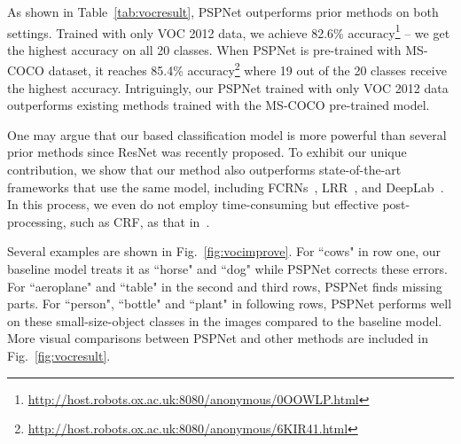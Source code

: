 \documentclass[10pt,twocolumn,letterpaper]{article}
\begin{document}
As shown in Table~\ref{tab:vocresult}, PSPNet outperforms prior methods on both settings.
Trained with only VOC 2012 data, we achieve 82.6\%
accuracy\footnote{\href{http://host.robots.ox.ac.uk:8080/anonymous/0OOWLP.html}{http://host.robots.ox.ac.uk:8080/anonymous/0OOWLP.html}}
-- we get the highest accuracy on all 20 classes. When PSPNet is pre-trained with MS-COCO
dataset, it reaches 85.4\%
accuracy\footnote{\href{http://host.robots.ox.ac.uk:8080/anonymous/6KIR41.html}{http://host.robots.ox.ac.uk:8080/anonymous/6KIR41.html}}
where 19 out of the 20 classes receive the highest accuracy. Intriguingly, our PSPNet
trained with only VOC 2012 data outperforms existing methods trained with the MS-COCO
pre-trained model.

One may argue that our based classification model is more powerful than several prior methods
since ResNet was recently proposed. To exhibit our unique contribution, we show that our
method also outperforms state-of-the-art frameworks that use the same model, including
FCRNs~\cite{wu2016bridging}, LRR~\cite{ghiasi2016laplacian}, and
DeepLab~\cite{chen2016deeplab}. In this process, we even do not employ time-consuming but
effective post-processing, such as CRF, as that in~\cite{chen2016deeplab,ghiasi2016laplacian}.

Several examples are shown in Fig.~\ref{fig:vocimprove}. For ``cows" in row one, our
baseline model treats it as ``horse" and ``dog" while PSPNet corrects these errors. For
``aeroplane" and ``table" in the second and third rows, PSPNet finds missing parts. For
``person", ``bottle" and ``plant" in following rows, PSPNet performs well on these
small-size-object classes in the images compared to the baseline model. More visual
comparisons between PSPNet and other methods are included in Fig.~\ref{fig:vocresult}.
\end{document}
